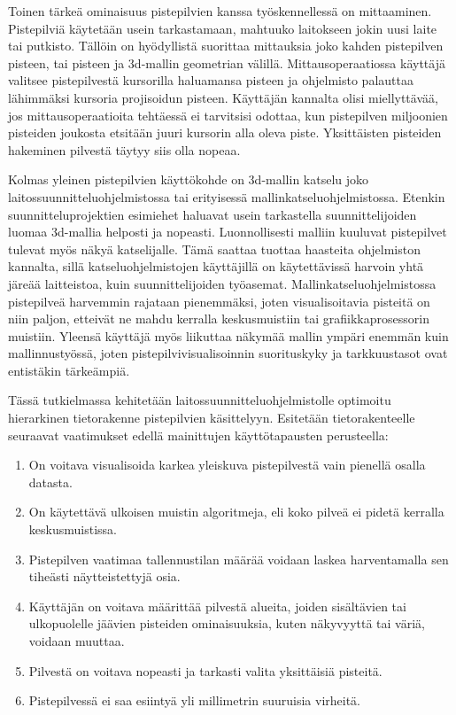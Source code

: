 \subtitle{Mittaaminen}
Toinen tärkeä ominaisuus pistepilvien kanssa työskennellessä on mittaaminen. Pistepilviä käytetään usein tarkastamaan, mahtuuko laitokseen jokin uusi laite tai putkisto. Tällöin on hyödyllistä suorittaa mittauksia joko kahden pistepilven pisteen, tai pisteen ja 3d-mallin geometrian välillä. Mittausoperaatiossa käyttäjä valitsee pistepilvestä kursorilla haluamansa pisteen ja ohjelmisto palauttaa lähimmäksi kursoria projisoidun pisteen. Käyttäjän kannalta olisi miellyttävää, jos mittausoperaatioita tehtäessä ei tarvitsisi odottaa, kun pistepilven miljoonien pisteiden joukosta etsitään juuri kursorin alla oleva piste. Yksittäisten pisteiden hakeminen pilvestä täytyy siis olla nopeaa.

\subtitle{Katselu}
Kolmas yleinen pistepilvien käyttökohde on 3d-mallin katselu joko laitossuunnitteluohjelmistossa tai erityisessä mallinkatseluohjelmistossa. Etenkin suunnitteluprojektien esimiehet haluavat usein tarkastella suunnittelijoiden luomaa 3d-mallia helposti ja nopeasti. Luonnollisesti malliin kuuluvat pistepilvet tulevat myös näkyä katselijalle. Tämä saattaa tuottaa haasteita ohjelmiston kannalta, sillä katseluohjelmistojen käyttäjillä on käytettävissä harvoin yhtä järeää laitteistoa, kuin suunnittelijoiden työasemat. Mallinkatseluohjelmistossa pistepilveä harvemmin rajataan pienemmäksi, joten visualisoitavia pisteitä on niin paljon, etteivät ne mahdu kerralla keskusmuistiin tai grafiikkaprosessorin muistiin. Yleensä käyttäjä myös liikuttaa näkymää mallin ympäri enemmän kuin mallinnustyössä, joten pistepilvivisualisoinnin suorituskyky ja tarkkuustasot ovat entistäkin tärkeämpiä.

Tässä tutkielmassa kehitetään laitossuunnitteluohjelmistolle optimoitu hierarkinen tietorakenne pistepilvien käsittelyyn. Esitetään tietorakenteelle seuraavat vaatimukset edellä mainittujen käyttötapausten perusteella:
\begin{enumerate}
    \item \label{vaatimus:lod} On voitava visualisoida karkea yleiskuva pistepilvestä vain pienellä osalla datasta. 
    \item \label{vaatimus:ooc} On käytettävä ulkoisen muistin algoritmeja, eli koko pilveä ei pidetä kerralla keskusmuistissa.
    \item \label{vaatimus:harvennus} Pistepilven vaatimaa tallennustilan määrää voidaan laskea harventamalla sen tiheästi näytteistettyjä osia. 
    \item \label{vaatimus:crop} Käyttäjän on voitava määrittää pilvestä alueita, joiden sisältävien tai ulkopuolelle jäävien pisteiden ominaisuuksia, kuten näkyvyyttä tai väriä, voidaan muuttaa.
    \item \label{vaatimus:select} Pilvestä on voitava nopeasti ja tarkasti valita yksittäisiä pisteitä.
    \item \label{vaatimus:virhe} Pistepilvessä ei saa esiintyä yli millimetrin suuruisia virheitä.
\end{enumerate}


